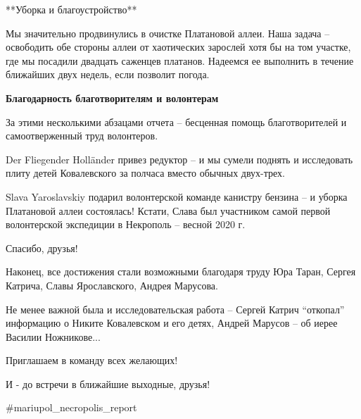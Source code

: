 **Уборка и благоустройство**

Мы значительно продвинулись в очистке Платановой аллеи. Наша задача –
освободить обе стороны аллеи от хаотических зарослей хотя бы на том участке,
где мы посадили двадцать саженцев платанов. Надеемся ее выполнить в течение
ближайших двух недель, если позволит погода.

\textbf{Благодарность благотворителям и волонтерам}

За этими несколькими абзацами отчета – бесценная помощь благотворителей и
самоотверженный труд волонтеров.

Der Fliegender Holländer привез редуктор – и мы сумели поднять и исследовать
плиту детей Ковалевского за полчаса вместо обычных двух-трех.

Slava Yaroslavskiy подарил волонтерской команде канистру бензина – и уборка
Платановой аллеи состоялась! Кстати, Слава был участником самой первой
волонтерской экспедиции в Некрополь – весной 2020 г. 🙂

Спасибо, друзья!

Наконец, все достижения стали возможными благодаря труду Юра Таран, Сергея
Катрича, Славы Ярославского, Андрея Марусова.

Не менее важной была и исследовательская работа – Сергей Катрич
\enquote{откопал} информацию о Никите Ковалевском и его детях, Андрей Марусов –
об иерее Василии Ножникове...

Приглашаем в команду всех желающих!

И - до встречи в ближайшие выходные, друзья!

\#mariupol\_necropolis\_report
